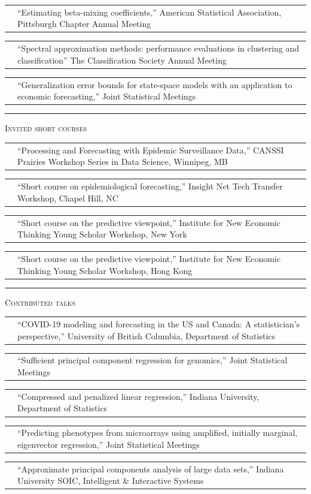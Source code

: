 \documentclass[11pt,letterpaper]{minimal/moderncv}
\makeatletter
\renewcommand{\section}[1]{  \par\addvspace{15pt}%
  \parbox[t]{\hintscolumnwidth}{\strut\raggedleft\raisebox{4pt}%
  {\rule{\hintscolumnwidth}{2pt}}}%
  \hspace{\separatorcolumnwidth}%
  \textsc{\Large #1}\par\nobreak\addvspace{6pt}%
}
\renewcommand*{\cvitem}[2]{%
  \begin{tabular}{@{}p{\hintscolumnwidth}@{\hspace{\separatorcolumnwidth}}%
    p{\maincolumnwidth}@{}}%
    \raggedleft {#1} &  {#2}%
  \end{tabular}%
}
\makeatother
\begin{document}
\cvitem{}{``Estimating beta-mixing coefficients,'' American Statistical
  Association, Pittsburgh Chapter Annual Meeting} 

\cvitem{}{``Spectral approximation methods: performance evaluations in
  clustering and classification'' The Classification Society Annual Meeting}

\cvitem{2010}{``Generalization error bounds for state-space models with an
  application to economic forecasting,''
  Joint Statistical Meetings}

\section{Invited short courses}

\cvitem{2025}{``Processing and Forecasting with Epidemic Surveillance Data,'' CANSSI Prairies Workshop Series in Data Science, Winnipeg, MB}

\cvitem{2024}{``Short course on epidemiological forecasting,'' Insight Net Tech Transfer Workshop, Chapel Hill, NC}

\cvitem{2015}{``Short course on the predictive viewpoint,''
  Institute for New Economic Thinking Young Scholar Workshop,
  New York}

\cvitem{2013}{``Short course on the predictive viewpoint,'' Institute for New
  Economic Thinking Young Scholar Workshop, 
  Hong Kong}
    
    
    
\section{Contributed talks}

\cvitem{2021}{``COVID-19 modeling and forecasting in the US and Canada:
  A statistician's perspective,'' University of British Columbia,
  Department of Statistics}

\cvitem{2019}{``Sufficient principal component regression for
  genomics,'' Joint Statistical Meetings}

\cvitem{2017}{ ``Compressed and penalized linear regression,'' Indiana
  University, Department of Statistics}

\cvitem{}{ ``Predicting phenotypes from microarrays using amplified,
  initially marginal, eigenvector regression,'' Joint Statistical Meetings}

\cvitem{2015}{ ``Approximate principal components analysis of large data sets,''
  Indiana University SOIC, Intelligent \& Interactive Systems}
\end{document}
